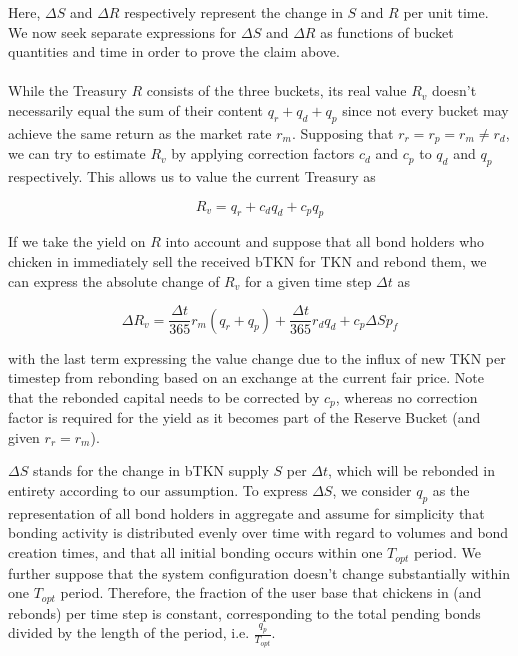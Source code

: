 \documentclass{article}
\begin{document}

Here, $\Delta S$ and $\Delta R$ respectively represent the change in $S$ and $R$ per unit time.  We now seek separate expressions for $\Delta S$ and $\Delta R$ as functions of bucket quantities and time in order to prove the claim above.

\paragraph{}
While the Treasury $R$ consists of the three buckets, its real value $R_v$ doesn't necessarily equal the sum of their content $q_r+q_d+q_p$ since not every bucket may achieve the same return as the market rate $r_m$. Supposing that $r_r=r_p=r_m \neq r_d$, we can try to estimate $R_v$ by applying correction factors $c_d$ and $c_p$ to $q_d$ and $q_p$ respectively. This allows us to value the current Treasury as

\begin{equation}
  \label{eq:correction-factors}
  R_v = q_r + c_d q_d + c_p q_p
\end{equation}

If we take the yield on $R$ into account and suppose that all bond holders who chicken in immediately sell the received bTKN for TKN and rebond them, we can express the absolute change of $R_v$ for a given time step $\Delta t$ as

\begin{equation}
  \label{eq:treasury-growth}
  \Delta R_v = \frac{\Delta t}{365} r_m (q_r + q_p) + \frac{\Delta t}{365} r_d  q_d + c_p \Delta S p_f 
\end{equation}

with the last term expressing the value change due to the influx of new TKN per timestep from rebonding based on an exchange at the current fair price. Note that the rebonded capital needs to be corrected by $c_p$, whereas no correction factor is required for the yield as it becomes part of the Reserve Bucket (and given $r_r=r_m$).

$\Delta S$ stands for the change in bTKN supply $S$ per $\Delta t$, which will be rebonded in entirety according to our assumption. To express $\Delta S$, we consider $q_p$ as the representation of all bond holders in aggregate and assume for simplicity that bonding activity is distributed evenly over time with regard to volumes and bond creation times, and that all initial bonding occurs within one $T_{opt}$ period.  We further suppose that the system configuration doesn't change substantially within one $T_{opt}$ period. Therefore, the fraction of the user base that chickens in (and rebonds) per time step is constant, corresponding to the total pending bonds divided by the length of the period, i.e. $\frac{q_p}{T_{opt}}$. 
\end{document}
